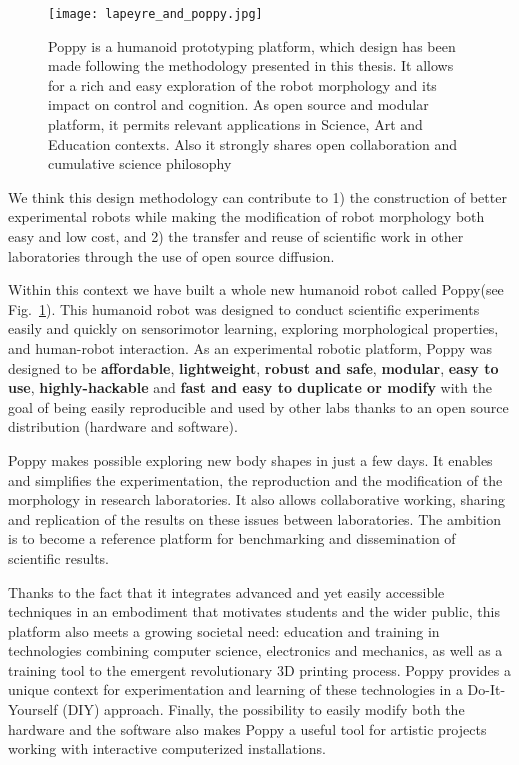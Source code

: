 \begin{figure}[tb]
    \begin{center}
        \texttt{[image: lapeyre\_and\_poppy.jpg]}
    \end{center}
    \caption{Poppy is a humanoid prototyping platform, which design has been made following the methodology presented in this thesis. It allows for a rich and easy exploration of the robot morphology and its impact on control and cognition. As open source and modular platform, it permits relevant applications in Science, Art and Education contexts. Also it strongly shares open collaboration and cumulative science philosophy}
    \label{fig:poppy_with_me}
\end{figure}

We think this design methodology can contribute to  1) the construction of better experimental robots while making the modification of robot morphology both easy and low cost, and 2) the transfer and reuse of scientific work in other laboratories through the use of open source diffusion.

Within this context we have built a whole new humanoid robot called Poppy\texttrademark (see Fig.~\ref{fig:poppy_with_me}). This humanoid robot was designed to conduct scientific experiments easily and quickly on sensorimotor learning, exploring morphological properties, and human-robot interaction. As an experimental robotic platform, Poppy was designed to be \textbf{affordable}, \textbf{lightweight}, \textbf{robust and safe}, \textbf{modular}, \textbf{easy to use}, \textbf{highly-hackable} and \textbf{fast and easy to duplicate or modify} with the goal of being easily reproducible and used by other labs thanks to an open source distribution (hardware and software).



Poppy makes possible exploring new body shapes in just a few days. It enables and simplifies the experimentation, the reproduction and the modification of the morphology in research laboratories. It also allows collaborative working, sharing and replication of the results on these issues between laboratories. The ambition is to become a reference platform for benchmarking and dissemination of scientific results.

Thanks to the fact that it integrates advanced and yet easily accessible techniques in an embodiment that motivates students and the wider public, this platform also meets a growing societal need: education and training in technologies combining computer science, electronics and mechanics, as well as a training tool to the emergent revolutionary 3D printing process. Poppy provides a unique context for experimentation and learning of these technologies in a Do-It-Yourself (DIY) approach. Finally, the possibility to easily modify both the hardware and the software also makes Poppy a useful tool for artistic projects working with interactive computerized installations.


